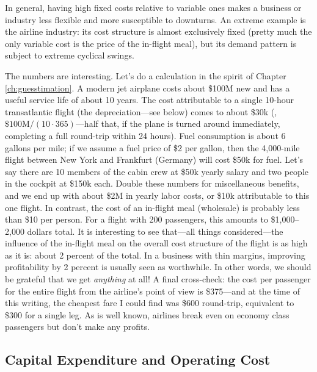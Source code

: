 In general, having high fixed costs relative to variable ones makes a
business or industry less flexible and more susceptible to downturns.
An extreme example is the airline industry: its cost structure is
almost exclusively fixed (pretty much the only variable cost is the
price of the in-flight meal), but its demand pattern is subject to
extreme cyclical swings.

The numbers are interesting. Let's do a calculation in the spirit of
Chapter \ref{ch:guesstimation}. A modern jet airplane costs about
\$100M new and has a useful service life of about 10 years. The cost
attributable to a single 10-hour transatlantic flight (the
depreciation---see below) comes to about \$30k (\ie,
$\text{\$100M}/(10\cdot365)$---half that, if the plane is turned
around immediately, completing a full round-trip within 24 hours).
Fuel consumption is about 6 gallons per mile; if we assume a fuel
price of \$2 per gallon, then the 4,000-mile flight between New York
and Frankfurt (Germany) will cost \$50k for fuel. Let's say there are
10 members of the cabin crew at \$50k yearly salary and two people in
the cockpit at \$150k each. Double these numbers for miscellaneous
benefits, and we end up with about \$2M in yearly labor costs, or \$10k
attributable to this one flight. In contrast, the cost of an in-flight
meal (wholesale) is probably less than \$10 per person.  For a flight
with 200 passengers, this amounts to \$1,000--2,000 dollars total.  It
is interesting to see that---all things considered---the influence of
the in-flight meal on the overall cost structure of the flight is as
high as it is: about 2 percent of the total. In a business with thin
margins, improving profitability by 2 percent is usually seen as
worthwhile.\vadjust{\pagebreak}  In other words, we should be grateful that we get
\emph{anything} at all! A final cross-check: the cost per passenger
for the entire flight from the airline's point of view is \$375---and
at the time of this writing, the cheapest fare I could find was \$600
round-trip, equivalent to \$300 for a single leg.  As is well known,
airlines break even on economy class passengers but don't make any
profits.

\subsection{Capital Expenditure and Operating Cost}

  
